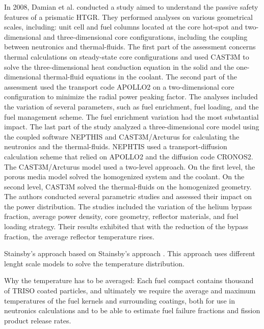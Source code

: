 In 2008, Damian et al. \cite{damian_vhtr_2008} conducted a study aimed to understand the passive safety features of a prismatic \gls{HTGR}.
They performed analyses on various geometrical scales, including: unit cell and fuel columns located at the core hot-spot and two-dimensional and three-dimensional core configurations, including the coupling between neutronics and thermal-fluids.
The first part of the assessment concerns thermal calculations on steady-state core configurations and used CAST3M \cite{studer_cast3marcturus_2007} to solve the three-dimensional heat conduction equation in the solid and the one-dimensional thermal-fluid equations in the coolant.
The second part of the assessment used the transport code APOLLO2 \cite{sanchez_apollo2_1999} on a two-dimensional core configuration to minimize the radial power peaking factor.
The analyses included the variation of several parameters, such as fuel enrichment, fuel loading, and the fuel management scheme.
The fuel enrichment variation had the most substantial impact.
The last part of the study analyzed a three-dimensional core model using the coupled software NEPTHIS \cite{cavalier_presentation_2005} and CAST3M/Arcturus for calculating the neutronics and the thermal-fluids.
NEPHTIS used a transport-diffusion calculation scheme that relied on APOLLO2 and the diffusion code CRONOS2.
The CAST3M/Arcturus model used a two-level approach.
On the first level, the porous media model solved the homogenized system and the coolant.
On the second level, CAST3M solved the thermal-fluids on the homogenized geometry.
The authors conducted several parametric studies and assessed their impact on the power distribution.
The studies included the variation of the helium bypass fraction, average power density, core geometry, reflector materials, and fuel loading strategy.
Their results exhibited that with the reduction of the bypass fraction, the average reflector temperature rises.









Stainsby's approach
based on Stainsby's approach \cite{stainsby_investigation_2008}.
This approach uses different lenght scale models to solve the temperature distribution.


Why the temperature has to be averaged:
Each fuel compact contains thousand of TRISO coated particles, and ultimately we require the average and maximum temperatures of the fuel kernels and surrounding coatings, both for use in neutronics calculations and to be able to estimate fuel failure fractions and fission product release rates.